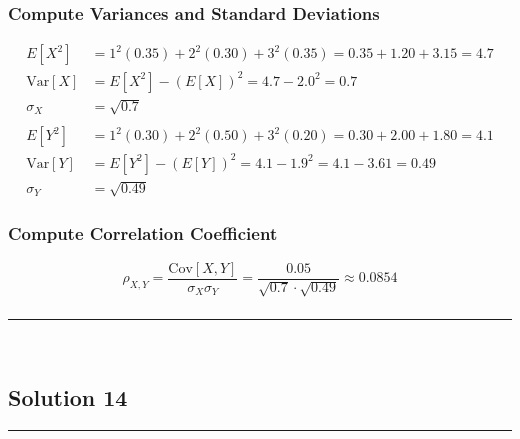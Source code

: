 \documentclass{article}
\begin{document}
\subsubsection*{Compute Variances and Standard Deviations}
\begin{align*}
    E[X^2] &= 1^2(0.35) + 2^2(0.30) + 3^2(0.35) = 0.35 + 1.20 + 3.15 = 4.7 \\
    \text{Var}[X] &= E[X^2] - (E[X])^2 = 4.7 - 2.0^2 = 0.7 \\
    \sigma_X &= \sqrt{0.7} \\
    \\
    E[Y^2] &= 1^2(0.30) + 2^2(0.50) + 3^2(0.20) = 0.30 + 2.00 + 1.80 = 4.1 \\
    \text{Var}[Y] &= E[Y^2] - (E[Y])^2 = 4.1 - 1.9^2 = 4.1 - 3.61 = 0.49 \\
    \sigma_Y &= \sqrt{0.49}
\end{align*}

\subsubsection*{Compute Correlation Coefficient}
$$\rho_{X, Y} = \frac{\text{Cov}[X, Y]}{\sigma_X \sigma_Y} = \frac{0.05}{\sqrt{0.7} \cdot \sqrt{0.49}} \approx 0.0854$$

\subsubsection*{}

\noindent\rule{\textwidth}{0.4pt}\\

\newpage

\subsection*{Solution 14}
\noindent\rule{\textwidth}{0.4pt}\\
\end{document}
